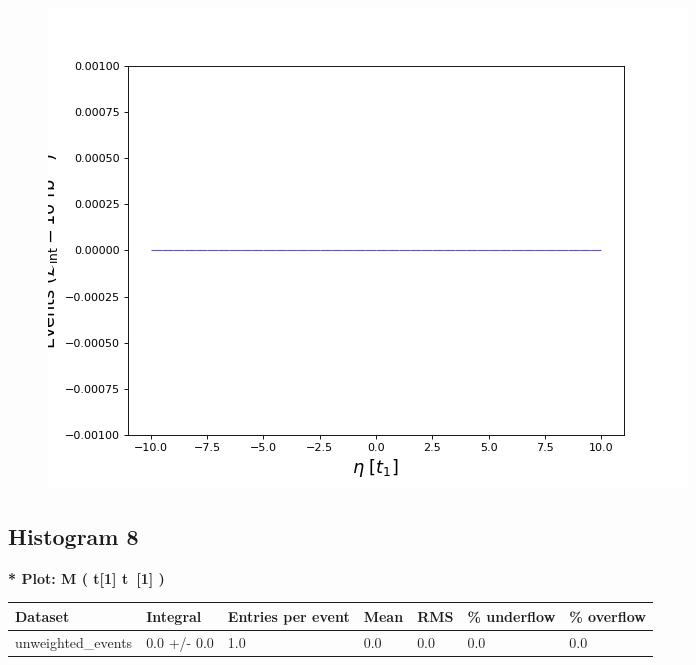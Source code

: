 \documentclass[a4paper, 10pt]{article}
\begin{document}
\begin{figure}[H]
  \begin{center}
    \includegraphics[scale=0.45]{selection_6.png}\\
\caption{   }
  \end{center}
\end{figure}
      \newpage
\subsection{ Histogram 8}

\textbf{* Plot: M ( t[1] t~[1] ) }\\
   \begin{table}[H]
  \begin{center}
    \begin{tabular}{|m{23.0mm}|m{23.0mm}|m{18.0mm}|m{19.0mm}|m{19.0mm}|m{19.0mm}|m{19.0mm}|}
      \hline
      {\cellcolor{yellow}         Dataset}& {\cellcolor{yellow}         Integral}& {\cellcolor{yellow}         Entries per event}& {\cellcolor{yellow}         Mean}& {\cellcolor{yellow}         RMS}& {\cellcolor{yellow}         \% underflow}& {\cellcolor{yellow}         \% overflow}\\
      \hline
      {\cellcolor{white}         unweighted\_events}& {\cellcolor{white}         0.0 +/\-- 0.0}& {\cellcolor{white}         1.0}& {\cellcolor{white}         0.0}& {\cellcolor{white}         0.0}& {\cellcolor{green}         0.0}& {\cellcolor{green}         0.0}\\
\hline
    \end{tabular}
  \end{center}
\end{table}
\end{document}
